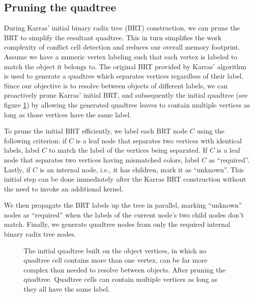 \documentclass[final,3p,times,twocolumn]{elsarticle}
\begin{document}
\subsection{Pruning the quadtree}
\label{sec:pruning}
During Karras' initial binary radix tree (BRT) construction, we can prune the BRT to simplify the resultant quadtree. This in turn simplifies the work complexity of conflict cell detection and reduces our overall memory footprint. Assume we have a numeric vertex labeling such that each vertex is labeled to match the object it belongs to. The original BRT provided by Karras' algorithm is used to generate a quadtree which separates vertices regardless of their label. Since our objective is to resolve between objects of different labels, we can proactively prune Karras' initial BRT, and subsequently the initial quadtree (see figure \ref{fig:pruning}) by allowing the generated quadtree leaves to contain multiple vertices as long as those vertices have the same label.

To prune the initial BRT efficiently, we label each BRT node $C$ using the following criterion: if $C$ is a leaf node that separates two vertices with identical labels, label $C$ to match the label of the vertices being separated. If $C$ is a leaf node that separates two vertices having mismatched colors, label $C$ as ``required''. Lastly, if $C$ is an internal node, i.e., it has children, mark it as ``unknown''. This initial step can be done immediately after the Karras BRT construction without the need to invoke an additional kernel.

We then propagate the BRT labels up the tree in parallel, marking ``unknown'' nodes as ``required'' when the labels of the current node's two child nodes don't match.  Finally, we generate quadtree nodes from only the required internal binary radix tree nodes.

\begin{figure}
  \centering
  \caption{
    \protect{} The initial quadtree built on the object vertices, in which no quadtree cell contains more than one vertex, can be far more complex than needed to resolve between objects.
    \protect{} After pruning the quadtree. Quadtree cells can contain multiple vertices as long as they all have the same label.
  }
  \label{fig:pruning}
\end{figure}
\end{document}
